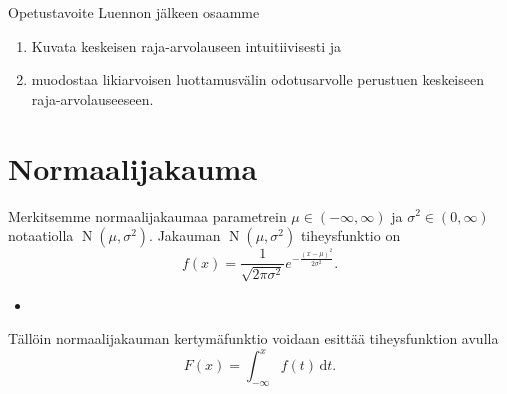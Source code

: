 \documentclass{beamer}
\DeclareMathOperator{\n}{\mathrm N}
\begin{document}

\begin{frame}{Opetustavoite}
  Luennon jälkeen osaamme
  \begin{enumerate}
    \item Kuvata keskeisen raja-arvolauseen intuitiivisesti ja
    \pause
    \item muodostaa likiarvoisen luottamusvälin odotusarvolle perustuen
    keskeiseen raja-arvolauseeseen.
  \end{enumerate}
\end{frame}


\section{Normaalijakauma}

\begin{frame}
  Merkitsemme normaalijakaumaa parametrein $\mu\in(-\infty, \infty)$ ja
  $\sigma^2\in(0,\infty)$ notaatiolla $\n\left(\mu, \sigma^2\right)$. Jakauman
  $\n\left(\mu, \sigma^2\right)$ tiheysfunktio on
  \begin{equation*}
    f(x) = \frac{1}{\sqrt{2\pi\sigma^2}} e^{-\frac{\left(x-\mu\right)^2}
    {2\sigma^2}}.
  \end{equation*}
  \pause
  \begin{itemize}
    \item[]
  \end{itemize}
  Tällöin normaalijakauman kertymäfunktio voidaan esittää tiheysfunktion avulla
  \begin{equation*}
    F\left(x\right) = \int_{-\infty}^{x} f(t)\,\mathrm{d}t.
  \end{equation*}
\end{frame}

\end{document}
